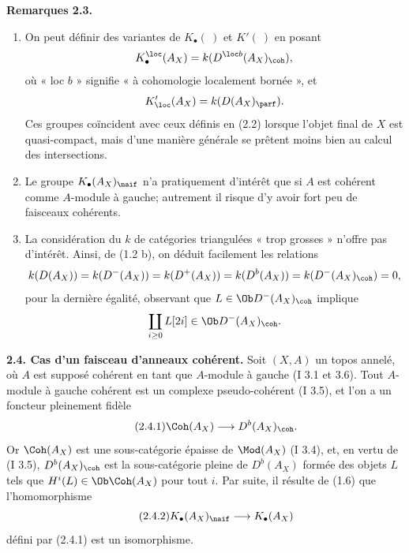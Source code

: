 \documentclass[11pt]{article}
\begin{document}
\textbf{Remarques 2.3.}
\begin{enumerate}[label=\alph*)]
\item On peut définir des variantes de \(K_{\bullet}(\ )\) et \(K'(\ )\) en posant
\[
 K_{\bullet}^{\loc}(A_X)=k(D^{\loc b}(A_X)_{\coh}),
\]
où « loc \(b\) » signifie « à cohomologie localement bornée », et
\[
 K_{\loc}'(A_X)=k(D(A_X)_{\parf}).
\]
Ces groupes coïncident avec ceux définis en (2.2) lorsque l'objet final de \(X\) est quasi-compact, mais d'une manière générale se prêtent moins bien au calcul des intersections.
\item Le groupe \(K_{\bullet}(A_X)_{\naif}\) n'a pratiquement d'intérêt que si \(A\) est cohérent comme \(A\)-module à gauche; autrement il risque d'y avoir fort peu de faisceaux cohérents.
\item La considération du \(k\) de catégories triangulées « trop grosses » n'offre pas d'intérêt. Ainsi, de (1.2 b), on déduit facilement les relations
\[
 k(D(A_X))=
 k(D^-(A_X))=
 k(D^+(A_X))=
 k(D^b(A_X))=
 k(D^-(A_X)_{\coh})=0,
\]
pour la dernière égalité, observant que \(L\in\Ob D^-(A_X)_{\coh}\) implique
\[
 \coprod_{i\geq0}L[2i]\in\Ob D^-(A_X)_{\coh}.
\]
\end{enumerate}

\textbf{2.4. Cas d'un faisceau d'anneaux cohérent.} Soit \((X,A)\) un topos annelé, où \(A\) est supposé cohérent en tant que \(A\)-module à gauche (I 3.1 et 3.6). Tout \(A\)-module à gauche cohérent est un complexe pseudo-cohérent (I 3.5), et l'on a un foncteur pleinement fidèle
\begin{equation}\tag{2.4.1}
 \Coh(A_X)\longrightarrow D^b(A_X)_{\coh}.
\end{equation}
Or \(\Coh(A_X)\) est une sous-catégorie épaisse de \(\Mod(A_X)\) (I 3.4), et, en vertu de (I 3.5), \(D^b(A_X)_{\coh}\) est la sous-catégorie pleine de \(D^b(A_X)\) formée des objets \(L\) tels que \(H^i(L)\in\Ob\Coh(A_X)\) pour tout \(i\). Par suite, il résulte de (1.6) que l'homomorphisme
\begin{equation}\tag{2.4.2}
 K_{\bullet}(A_X)_{\naif}\longrightarrow K_{\bullet}(A_X)
\end{equation}
défini par (2.4.1) est un isomorphisme.
\end{document}
